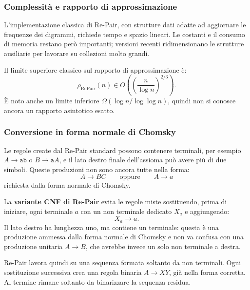 \documentclass{article}
\theoremstyle{definition}
\numberwithin{equation}{section}
\begin{document}
\subsubsection{Complessità e rapporto di approssimazione}
L'implementazione classica di Re-Pair, con strutture dati adatte ad aggiornare
le frequenze dei digrammi, richiede tempo e spazio lineari. Le costanti e il
consumo di memoria restano però importanti; versioni recenti ridimensionano le
strutture ausiliarie per lavorare su collezioni molto grandi.

Il limite superiore classico sul rapporto di approssimazione è:
\[
    \rho_{\mathrm{RePair}}(n)
    \in
    O\left(
    \left(\frac{n}{\log n}\right)^{2/3}
    \right).
\]
È noto anche un limite inferiore
$\Omega(\log n/\log\log n)$, quindi non si conosce ancora un rapporto
asintotico esatto.

\subsubsection{Conversione in forma normale di Chomsky}
Le regole create dal Re-Pair standard possono contenere terminali, per esempio
$A\to\texttt{ab}$ o $B\to\texttt{a}A$, e il lato destro finale dell'assioma
può avere più di due simboli. Queste produzioni non sono ancora tutte nella
forma:
\[
    A\to BC
    \qquad\text{oppure}\qquad
    A\to a
\]
richiesta dalla forma normale di Chomsky.

La \textbf{variante CNF di Re-Pair} evita le regole miste sostituendo, prima di
iniziare, ogni terminale $a$ con un non terminale dedicato $X_a$ e aggiungendo:
\[
    X_a\to a.
\]
Il lato destro ha lunghezza uno, ma contiene un terminale: questa è una
produzione ammessa dalla forma normale di Chomsky e non va confusa con una
produzione unitaria $A\to B$, che avrebbe invece un solo non terminale a
destra.

Re-Pair lavora quindi su una sequenza formata soltanto da non terminali. Ogni
sostituzione successiva crea una regola binaria $A\to XY$, già nella forma
corretta. Al termine rimane soltanto da binarizzare la sequenza residua.
\end{document}
